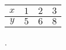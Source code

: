 \begin{tabular}{c|c c c}
\(\displaystyle x\)  & \(\displaystyle 1\)  & \(\displaystyle 2\)  & \(\displaystyle 3\) \\
\hline
\(\displaystyle y\)  & \(\displaystyle 5\)  & \(\displaystyle 6\)  & \(\displaystyle 8\)
\end{tabular}.